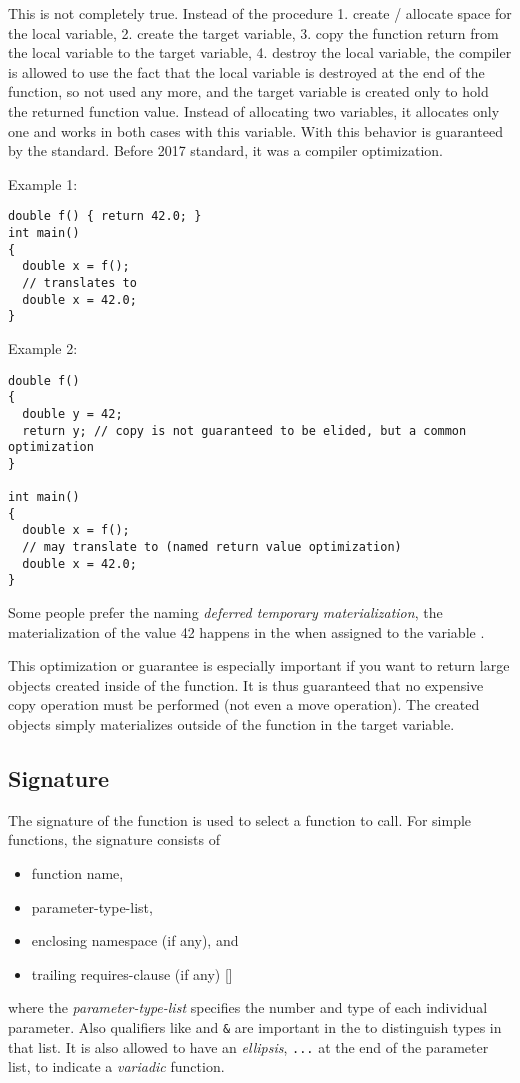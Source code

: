 This is not completely true. Instead of the procedure  1. create / allocate space for the local variable, 2. create the target variable,
3. copy the function return from the local variable to the target variable, 4. destroy the local variable, the compiler is allowed to use the
fact that the local variable is destroyed at the end of the function, so not used any more, and the target variable is created only to hold
the returned function value. Instead of allocating two variables, it allocates only one and works in both cases with this variable.
With \marginpar{[\cxx{17}]} this behavior is guaranteed by the standard. Before 2017 standard, it was a compiler optimization.

Example 1:
\begin{verbatim}
double f() { return 42.0; }
int main()
{
  double x = f();
  // translates to
  double x = 42.0;
}
\end{verbatim}

Example 2:
\begin{verbatim}
double f()
{
  double y = 42;
  return y; // copy is not guaranteed to be elided, but a common optimization
}

int main()
{
  double x = f();
  // may translate to (named return value optimization)
  double x = 42.0;
}
\end{verbatim}

Some people prefer the naming \emph{deferred temporary materialization}, \ie the materialization of the value 42 happens in the  when
assigned to the variable .

This optimization or guarantee is especially important if you want to return large objects created inside of the function. It is thus
guaranteed that no expensive copy operation must be performed (not even a move operation). The created objects simply materializes outside of
the function in the target variable.


\subsection{Signature\label{sec:function-signature}}
The signature of the function is used to select a function to call. For simple functions, the signature consists of
\begin{itemize}
  \item function name,
  \item parameter-type-list,
  \item enclosing namespace (if any), and
  \item trailing requires-clause (if any) []
\end{itemize}
where the \emph{parameter-type-list} specifies the number and type of each individual parameter. Also qualifiers like  and \texttt{\&}
are important in the to distinguish types in that list. It is also allowed to have an \emph{ellipsis}, \ie \texttt{...} at the end of the parameter
list, to indicate a \emph{variadic} function.

